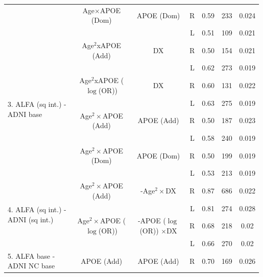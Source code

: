 \begin{table}[htbp]
{\begin{tabular}{@{}p{7cm}cccccc}
       & \cellcolor{Gray} Age$\times$APOE (Dom) & \cellcolor{Gray} APOE (Dom)  & \cellcolor{Gray} R    & \cellcolor{Gray} 0.59 & \cellcolor{Gray} 233 & \cellcolor{Gray} 0.024 \\
     &    \cellcolor{Gray}  & \cellcolor{Gray} & \cellcolor{Gray} L    & \cellcolor{Gray} 0.51 & \cellcolor{Gray} 109  & \cellcolor{Gray} 0.021 \\ \midrule
\multirow{8}{*}{3. ALFA (sq int.) - ADNI base} & \cellcolor{Gray} Age$^2$xAPOE (Add) & \cellcolor{Gray} DX  & \cellcolor{Gray} R    & \cellcolor{Gray} 0.50 & \cellcolor{Gray} 154 & \cellcolor{Gray} 0.021 \\
  & \cellcolor{Gray}  & \cellcolor{Gray} & \cellcolor{Gray} L    & \cellcolor{Gray} 0.62 &\cellcolor{Gray} 273  & \cellcolor{Gray} 0.019 \\
                               &  Age$^2$xAPOE ($\log$(OR)) & DX  & R  & 0.60 & 131 & 0.022 \\
                                &         &          & L    & 0.63  & 275 & 0.019 \\
                               & Age$^2\times$APOE (Add) & APOE (Add)  & R    & 0.50 & 187 & 0.023 \\
                               &          &          & L    & 0.58 & 240  & 0.019 \\
                               & Age$^2\times$APOE (Dom) & APOE (Dom)  & R    & 0.50 & 199 & 0.019 \\
                               &          &          & L    & 0.53 & 213  & 0.019 \\ \midrule
\multirow{4}{*}{4. ALFA (sq int.) - ADNI (sq int.)} & \cellcolor{Gray} Age$^2\times$APOE (Add) & \cellcolor{Gray} -Age$^2\times$DX  & \cellcolor{Gray} R    & \cellcolor{Gray} 0.87 & \cellcolor{Gray} 686 & \cellcolor{Gray} 0.022 \\
                  &  \cellcolor{Gray}   &  \cellcolor{Gray} & \cellcolor{Gray} L    & \cellcolor{Gray} 0.81 & \cellcolor{Gray} 274  & \cellcolor{Gray} 0.028 \\ 
&  \cellcolor{Gray} Age$^2\times$APOE ($\log$(OR)) & \cellcolor{Gray} -APOE ($\log$(OR)) $\times$DX  & \cellcolor{Gray} R    & \cellcolor{Gray} 0.68 & \cellcolor{Gray} 218 & \cellcolor{Gray} 0.02 \\
                  & \cellcolor{Gray}  & \cellcolor{Gray}  & \cellcolor{Gray} L    & \cellcolor{Gray} 0.66 & \cellcolor{Gray} 270 & \cellcolor{Gray} 0.02 \\ \midrule
\multirow{2}{*}{5. ALFA base - ADNI NC base} & \cellcolor{Gray} APOE (Add)   & \cellcolor{Gray} APOE (Add)  & \cellcolor{Gray} R   & \cellcolor{Gray} 0.70 & \cellcolor{Gray} 169 & \cellcolor{Gray} 0.026  \\ 

\end{tabular}}
\end{table}

